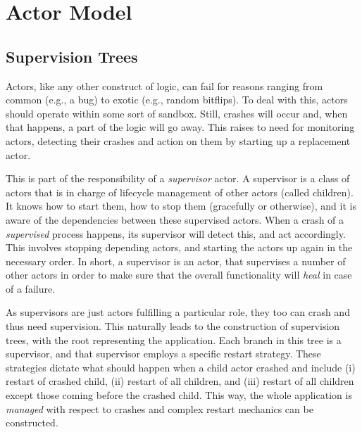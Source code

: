 \section{Actor Model}




\subsection{Supervision Trees}

Actors, like any other construct of logic, can fail for reasons ranging from common (e.g., a bug) to exotic (e.g., random bitflips). To deal with this, actors should operate within some sort of sandbox. Still, crashes will occur and, when that happens, a part of the logic will go away. This raises to need for monitoring actors, detecting their crashes and action on them by starting up a replacement actor.

This is part of the responsibility of a \textsl{supervisor} actor. A supervisor is a class of actors that is in charge of lifecycle management of other actors (called children). It knows how to start them, how to stop them (gracefully or otherwise), and it is aware of the dependencies between these supervised actors. When a crash of a \textsl{supervised} process happens, its supervisor will detect this, and act accordingly. This involves stopping depending actors, and starting the actors up again in the necessary order. In short, a supervisor is an actor, that supervises a number of other actors in order to make sure that the overall functionality will \textsl{heal} in case of a failure.

As supervisors are just actors fulfilling a particular role, they too can crash and thus need supervision. This naturally leads to the construction of supervision trees, with the root representing the application. Each branch in this tree is a supervisor, and that supervisor employs a specific restart strategy. These strategies dictate what should happen when a child actor crashed and include (i) restart of crashed child, (ii) restart of all children, and (iii) restart of all children except those coming before the crashed child. This way, the whole application is \textsl{managed} with respect to crashes and complex restart mechanics can be constructed.


